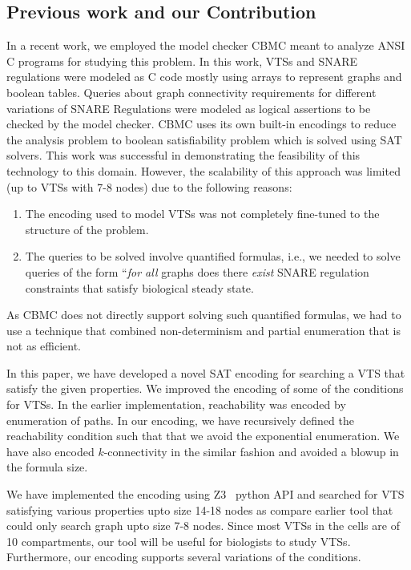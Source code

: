 \subsection{Previous work and our Contribution}
In a recent work, we employed the model checker CBMC \cite{CKY03,
	ckl2004} meant to analyze ANSI C programs for studying this problem.
%
In this work, VTSs and SNARE regulations were modeled as C code mostly
using arrays to represent graphs and boolean tables.
%
Queries about graph connectivity requirements for different variations
of SNARE Regulations were modeled as logical assertions to be checked
by the model checker.
%
CBMC uses its own built-in encodings to reduce the analysis problem to
boolean satisfiability problem which is solved using SAT solvers.
%
This work was successful in demonstrating the feasibility of this
technology to this domain.
%
However, the scalability of this approach was limited (up to VTSs
with 7-8 nodes) due to the following reasons:
\begin{enumerate}
	\item The encoding used to model VTSs was not completely fine-tuned
	to the structure of the problem.
	\item The queries to be solved involve quantified formulas, i.e., we
	needed to solve queries of the form ``\emph{for all} graphs does there
	\emph{exist} SNARE regulation constraints that satisfy biological
	steady state.
\end{enumerate} As CBMC does not directly support solving such
quantified formulas, we had to use a technique that combined
non-determinism and partial enumeration that is not as
efficient.\newline

%
In this paper, we have developed a novel SAT encoding for
searching a VTS that satisfy the given properties.
%
We improved the encoding of some of the conditions for VTSs.
%
In the earlier implementation, reachability was encoded by
enumeration of paths.
%
In our encoding, we have recursively defined the reachability condition
such that that we avoid the exponential enumeration.
%
We have also encoded $k$-connectivity in the similar fashion and
avoided a blowup in the formula size.
%

We have implemented the encoding using Z3~\cite{z3} python API and searched for
VTS satisfying various properties upto size 14-18 nodes as compare
earlier tool that could only search graph upto size 7-8 nodes.
%
Since most VTSs in the cells are of 10 compartments,
our tool will be useful for biologists to study VTSs.
%
Furthermore, our encoding supports several variations of
the conditions.\newline

